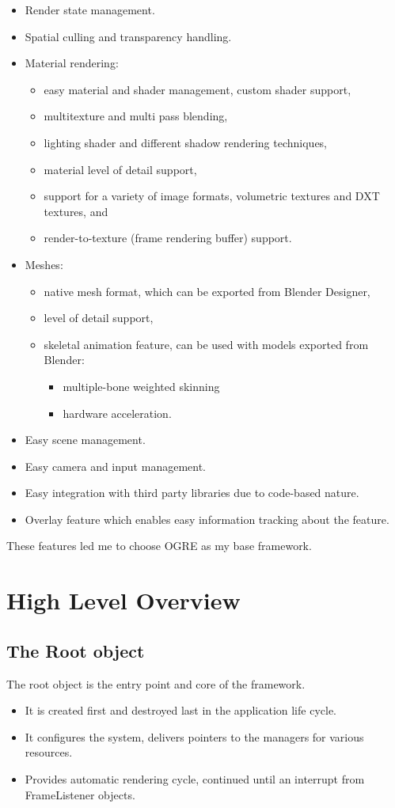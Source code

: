\begin{itemize}
\item Render state management.
\item Spatial culling and transparency handling.
\item Material rendering:
\begin{itemize}
  \item easy material and shader management, custom shader support,
  \item multitexture and multi pass blending,
  \item lighting shader and different shadow rendering techniques,
  \item material level of detail support,
  \item support for a variety of image formats, volumetric textures and DXT textures, and
  \item render-to-texture (frame rendering buffer) support.
\end{itemize}
\item Meshes:
\begin{itemize}
  \item native mesh format, which can be exported from Blender Designer,
  \item level of detail support,
  \item skeletal animation feature, can be used with models exported from Blender:
\begin{itemize}
  \item multiple-bone weighted skinning
  \item hardware acceleration.
\end{itemize}
\end{itemize}
\item Easy scene management.
\item Easy camera and input management.
\item Easy integration with third party libraries due to code-based nature.
\item Overlay feature which enables easy information tracking about the feature.
\end{itemize}

These features led me to choose OGRE as my base framework.

\section{High Level Overview}
\subsection{The Root object}
The root object is the entry point and core of the framework.
\begin{itemize}
\item It is created first and destroyed last in the application life cycle. 
\item It configures the system, delivers pointers to the managers for various resources.
\item Provides automatic rendering cycle, continued until an interrupt from FrameListener objects.
\end{itemize}

